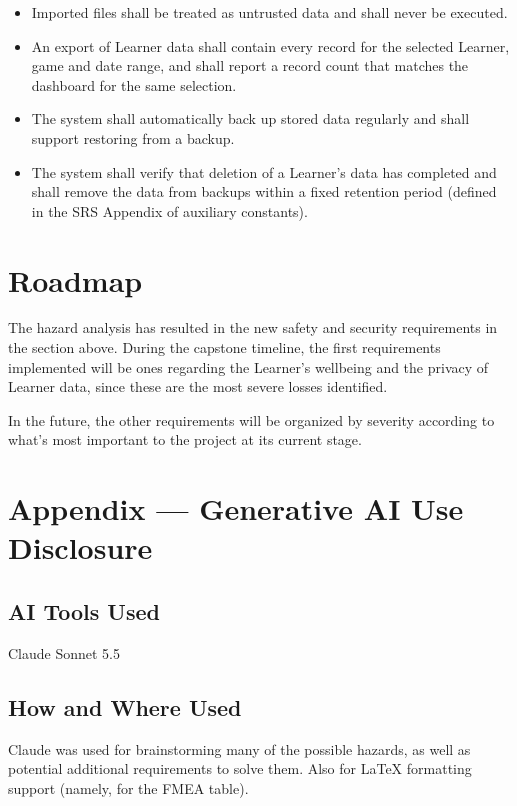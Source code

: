 \documentclass{article}
\begin{document}
\begin{itemize}
    \item[\textbf{SR-15.}] Imported files shall be treated as untrusted data and shall never be executed.
    \item[\textbf{SR-16.}] An export of Learner data shall contain every record for the selected Learner, game and date range, and shall report a record count that matches the dashboard for the same selection.
    \item[\textbf{SR-17.}] The system shall automatically back up stored data regularly and shall support restoring from a backup.
    \item[\textbf{SR-18.}] The system shall verify that deletion of a Learner's data has completed and shall remove the data from backups within a fixed retention period (defined in the SRS Appendix of auxiliary constants).
\end{itemize}


\section{Roadmap}

The hazard analysis has resulted in the new safety and security requirements in the section above. During the capstone timeline, the first requirements implemented will be ones regarding the Learner's wellbeing and the privacy of Learner data, since these are the most severe losses identified.

In the future, the other requirements will be organized by severity according to what's most important to the project at its current stage.

\newpage{}

\section{Appendix --- Generative AI Use Disclosure}

\subsection{AI Tools Used}

Claude Sonnet 5.5

\subsection{How and Where Used}

Claude was used for brainstorming many of the possible hazards, as well as potential additional requirements to solve them. Also for LaTeX formatting support (namely, for the FMEA table).
\end{document}

